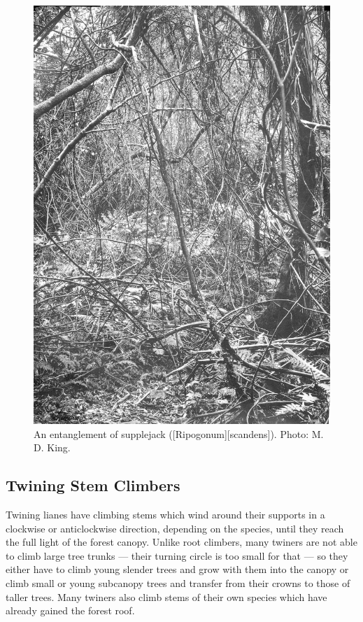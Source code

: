 \begin{figure}[htb]
\begin{minipage}[t]{0.478\textwidth}
    	\includegraphics[width=\textwidth]{graphics/figure33supplejack.jpg}
    	\caption[An entanglement of supplejack]{An entanglement of supplejack ([Ripogonum][scandens]). Photo:  M. D. King.}%
    	\label{fig:33supplejack}
	\end{minipage}
\end{figure}

\subsection{Twining Stem Climbers}

Twining lianes have climbing stems which wind around their supports in a clockwise or anticlockwise direction, depending on the species, until they reach the full light of the forest canopy.
Unlike root climbers, many twiners are not able to climb large tree trunks --- their turning circle is too small for that --- so they either have to climb young slender trees and grow with them into the canopy or climb small or young subcanopy trees and transfer from their crowns to those of taller trees.
Many twiners also climb stems of their own species which have already gained the forest roof.

